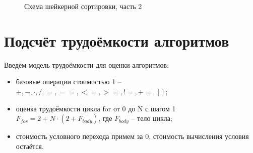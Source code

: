 \documentclass[12pt,a4paper]{report}
\begin{document}
\begin{figure}[h]
    \caption{Схема шейкерной сортировки, часть 2}
    \label{fig:image}
\end{figure}

\section{Подсчёт трудоёмкости алгоритмов}

Введём модель трудоёмкости для оценки алгоритмов:
\begin{itemize}
    \item базовые операции стоимостью 1 -- $+, -, \cdot , /, =, ==, <=, >=, !=, +=, []$;
    \item оценка трудоёмкости цикла for от 0 до N с шагом 1 $F_{for} = 2 + N \cdot (2 + F_{body})$, где $F_{body}$ -- тело цикла;
    \item стоимость условного перехода примем за 0, стоимость вычисления условия остаётся. 
\end{itemize}
\end{document}
